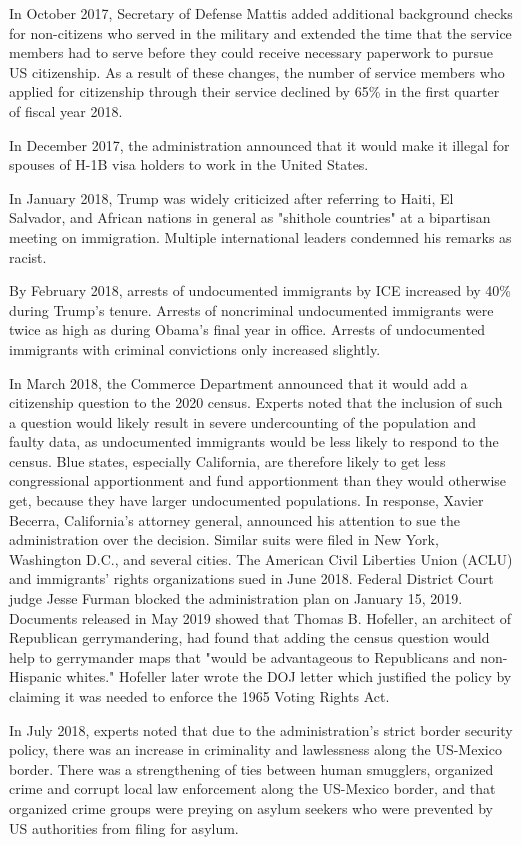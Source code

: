In October 2017, Secretary of Defense Mattis added additional background
checks for non-citizens who served in the military and extended the time
that the service members had to serve before they could receive
necessary paperwork to pursue US citizenship. As a result of these
changes, the number of service members who applied for citizenship
through their service declined by 65\% in the first quarter of fiscal
year 2018.

In December 2017, the administration announced that it would make it
illegal for spouses of H-1B visa holders to work in the United States.

In January 2018, Trump was widely criticized after referring to Haiti,
El Salvador, and African nations in general as "shithole countries" at a
bipartisan meeting on immigration. Multiple international leaders
condemned his remarks as racist.

By February 2018, arrests of undocumented immigrants by ICE increased by
40\% during Trump's tenure. Arrests of noncriminal undocumented
immigrants were twice as high as during Obama's final year in office.
Arrests of undocumented immigrants with criminal convictions only
increased slightly.

In March 2018, the Commerce Department announced that it would add a
citizenship question to the 2020 census. Experts noted that the
inclusion of such a question would likely result in severe undercounting
of the population and faulty data, as undocumented immigrants would be
less likely to respond to the census. Blue states, especially
California, are therefore likely to get less congressional apportionment
and fund apportionment than they would otherwise get, because they have
larger undocumented populations. In response, Xavier Becerra,
California's attorney general, announced his attention to sue the
administration over the decision. Similar suits were filed in New York,
Washington D.C., and several cities. The American Civil Liberties Union
(ACLU) and immigrants' rights organizations sued in June 2018. Federal
District Court judge Jesse Furman blocked the administration plan on
January 15, 2019. Documents released in May 2019 showed that Thomas B.
Hofeller, an architect of Republican gerrymandering, had found that
adding the census question would help to gerrymander maps that "would be
advantageous to Republicans and non-Hispanic whites." Hofeller later
wrote the DOJ letter which justified the policy by claiming it was
needed to enforce the 1965 Voting Rights Act.

In July 2018, experts noted that due to the administration's strict
border security policy, there was an increase in criminality and
lawlessness along the US-Mexico border. There was a strengthening of
ties between human smugglers, organized crime and corrupt local law
enforcement along the US-Mexico border, and that organized crime groups
were preying on asylum seekers who were prevented by US authorities from
filing for asylum.

